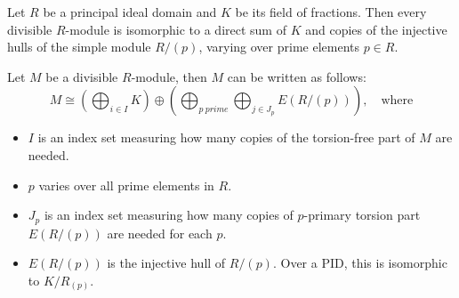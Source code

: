 \begin{theorem}
    Let $R$ be a principal ideal domain and $K$ be its field of fractions. Then every divisible
    $R$-module is isomorphic to a direct sum of $K$ and copies of the injective hulls
    of the simple module $R/ (p)$, varying over prime elements $p\in R$. \par
    Let $M$ be a divisible $R$-module, then $M$ can be written as follows:
    \[M \cong \left(\bigoplus_{i \in I} K\right) \oplus \left(\bigoplus_{p \ prime} \bigoplus_{j \in J_p}
        E(R / (p))\right), \quad \text{where}  \]
    \begin{itemize}
        \item $I$ is an index set measuring how many copies of the torsion-free part of $M$ are needed.
        \item $p$ varies over all prime elements in $R$.
        \item $J_p$ is an index set measuring how many copies of $p$-primary torsion part
                $E(R/(p))$ are needed for each $p$.
        \item $E(R/(p))$ is the injective hull of $R/(p)$. Over a PID, this is isomorphic to
                $K/R_{(p)}$.
    \end{itemize}
    \label{thm: structure_div_mod_PID}
\end{theorem}


